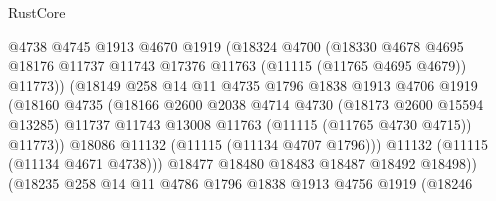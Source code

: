 \begin{lexlean}{RustCore}
\begin{coremodule}
                                @4738
                                @4745
                                @1913
                                @4670
                                @1919
                                (@18324
                                  @4700
                                  (@18330
                                    @4678
                                    @4695
                                    @18176
                                    @11737
                                    @11743
                                    @17376
                                    @11763
                                    (@11115 (@11765 @4695 @4679))
                                    @11773))
                                (@18149
                                  @258
                                  @14
                                  @11
                                  @4735
                                  @1796
                                  @1838
                                  @1913
                                  @4706
                                  @1919
                                  (@18160
                                    @4735
                                    (@18166
                                      @2600
                                      @2038
                                      @4714
                                      @4730
                                      (@18173 @2600 @15594 @13285)
                                      @11737
                                      @11743
                                      @13008
                                      @11763
                                      (@11115 (@11765 @4730 @4715))
                                      @11773))
                                  @18086
                                  @11132
                                  (@11115 (@11134 @4707 @1796)))
                                @11132
                                (@11115 (@11134 @4671 @4738)))
                              @18477
                              @18480
                              @18483
                              @18487
                              @18492
                              @18498))
                          (@18235
                            @258
                            @14
                            @11
                            @4786
                            @1796
                            @1838
                            @1913
                            @4756
                            @1919
                            (@18246

\end{coremodule}
\end{lexlean}

